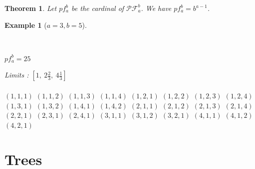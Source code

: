 \documentclass[12pt]{report}
\newtheorem{theorem}{Theorem}
\newtheorem*{example}{Example}
\begin{document}
\begin{theorem}
    Let $pf^b_a$ be the cardinal of $\mathcal{PF}^b_a$.
    We have $pf^b_a = b^{a-1}$.
\end{theorem}

\begin{example}[$a = 3, b = 5$]
    ~\\
    \begin{itemize*}\\
        \item $pf^b_a = 25$
        \item Limits : $[1,\ 2 \frac{2}{3},\ 
            4 \frac{1}{3}]$\\\\
        \subitem $(1, 1, 1)$
        \subitem $(1, 1, 2)$
        \subitem $(1, 1, 3)$
        \subitem $(1, 1, 4)$
        \subitem $(1, 2, 1)$
        \subitem $(1, 2, 2)$
        \subitem $(1, 2, 3)$
        \subitem $(1, 2, 4)$
        \subitem $(1, 3, 1)$
        \subitem $(1, 3, 2)$
        \subitem $(1, 4, 1)$
        \subitem $(1, 4, 2)$
        \subitem $(2, 1, 1)$
        \subitem $(2, 1, 2)$
        \subitem $(2, 1, 3)$
        \subitem $(2, 1, 4)$
        \subitem $(2, 2, 1)$
        \subitem $(2, 3, 1)$
        \subitem $(2, 4, 1)$
        \subitem $(3, 1, 1)$
        \subitem $(3, 1, 2)$
        \subitem $(3, 2, 1)$
        \subitem $(4, 1, 1)$
        \subitem $(4, 1, 2)$
        \subitem $(4, 2, 1)$
    \end{itemize*}
\end{example}

\chapter{Trees}
\end{document}
